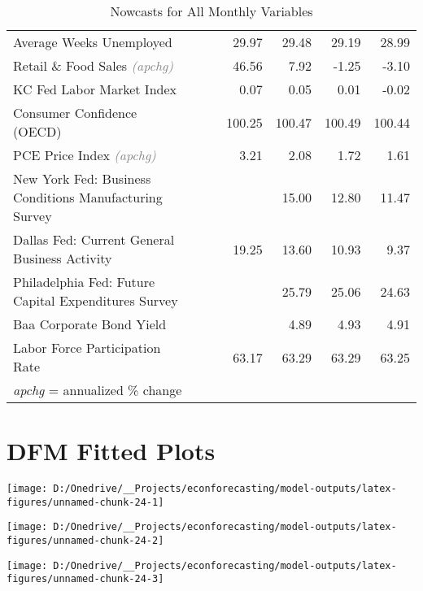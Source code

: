 \documentclass[11pt, letterpaper]{article}\usepackage[]{graphicx}\usepackage[]{color}
\begin{document}
\begin{table}[H]
\begin{tabular}{lrrrrrr}
  Average Weeks Unemployed &  &  & 29.97 & 29.48 & 29.19 & 28.99 \\ 
  Retail \& Food Sales \textit{\footnotesize\textcolor{gray}{(apchg)}} &  &  & 46.56 & 7.92 & -1.25 & -3.10 \\ 
  KC Fed Labor Market Index &  &  & 0.07 & 0.05 & 0.01 & -0.02 \\ 
  Consumer Confidence (OECD) &  &  & 100.25 & 100.47 & 100.49 & 100.44 \\ 
  PCE Price Index \textit{\footnotesize\textcolor{gray}{(apchg)}} &  &  & 3.21 & 2.08 & 1.72 & 1.61 \\ 
  New York Fed: Business Conditions Manufacturing Survey &  &  &  & 15.00 & 12.80 & 11.47 \\ 
  Dallas Fed: Current General Business Activity &  &  & 19.25 & 13.60 & 10.93 & 9.37 \\ 
  Philadelphia Fed: Future Capital Expenditures Survey &  &  &  & 25.79 & 25.06 & 24.63 \\ 
  Baa Corporate Bond Yield &  &  &  & 4.89 & 4.93 & 4.91 \\ 
  Labor Force Participation Rate &  &  & 63.17 & 63.29 & 63.29 & 63.25 \\ 
   \hline 
 \textit{apchg} = annualized \% change 
\end{tabular}
\endgroup
\caption{Nowcasts for All Monthly Variables} 
\end{table}



\appendix
\appendixpage
\addappheadtotoc

\section{DFM Fitted Plots}


{\centering \texttt{[image: D:/Onedrive/\_\_Projects/econforecasting/model-outputs/latex-figures/unnamed-chunk-24-1]} 

}




{\centering \texttt{[image: D:/Onedrive/\_\_Projects/econforecasting/model-outputs/latex-figures/unnamed-chunk-24-2]} 

}




{\centering \texttt{[image: D:/Onedrive/\_\_Projects/econforecasting/model-outputs/latex-figures/unnamed-chunk-24-3]} 

}
\end{document}
